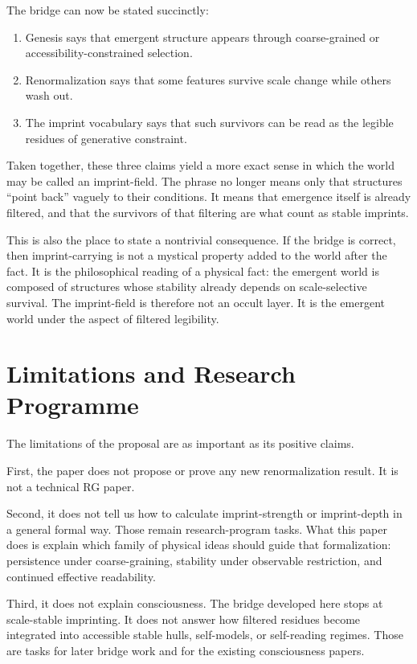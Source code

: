 \documentclass[12pt]{article}
\begin{document}
The bridge can now be stated succinctly:

\begin{enumerate}
\item Genesis says that emergent structure appears through coarse-grained or accessibility-constrained selection.
\item Renormalization says that some features survive scale change while others wash out.
\item The imprint vocabulary says that such survivors can be read as the legible residues of generative constraint.
\end{enumerate}

Taken together, these three claims yield a more exact sense in which the world may be called an imprint-field. The phrase no longer means only that structures ``point back'' vaguely to their conditions. It means that emergence itself is already filtered, and that the survivors of that filtering are what count as stable imprints.

This is also the place to state a nontrivial consequence. If the bridge is correct, then imprint-carrying is not a mystical property added to the world after the fact. It is the philosophical reading of a physical fact: the emergent world is composed of structures whose stability already depends on scale-selective survival. The imprint-field is therefore not an occult layer. It is the emergent world under the aspect of filtered legibility.

\section{Limitations and Research Programme}

The limitations of the proposal are as important as its positive claims.

First, the paper does not propose or prove any new renormalization result. It is not a technical RG paper.

Second, it does not tell us how to calculate imprint-strength or imprint-depth in a general formal way. Those remain research-program tasks. What this paper does is explain which family of physical ideas should guide that formalization: persistence under coarse-graining, stability under observable restriction, and continued effective readability.

Third, it does not explain consciousness. The bridge developed here stops at scale-stable imprinting. It does not answer how filtered residues become integrated into accessible stable hulls, self-models, or self-reading regimes. Those are tasks for later bridge work and for the existing consciousness papers.
\end{document}
